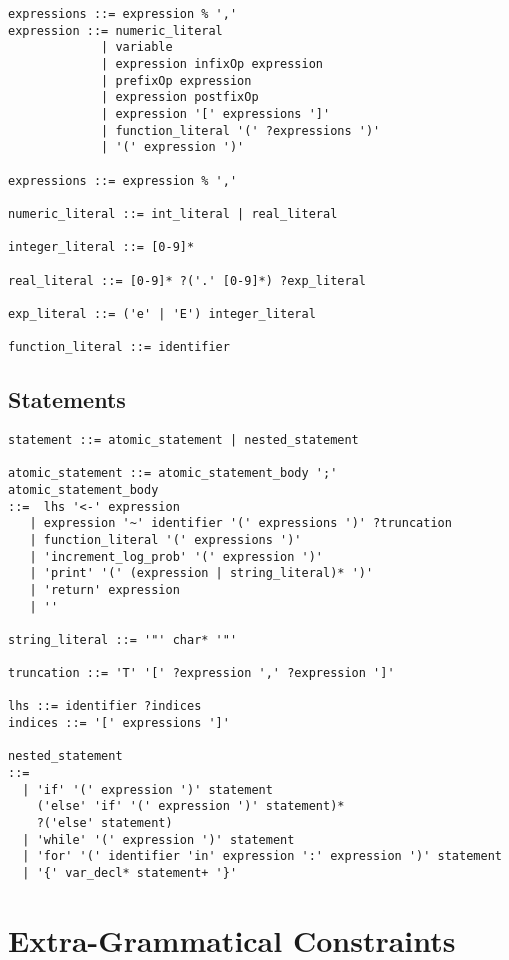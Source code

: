 {
\small
\begin{Verbatim}[fontsize=\small]
expressions ::= expression % ','
expression ::= numeric_literal
             | variable
             | expression infixOp expression
             | prefixOp expression
             | expression postfixOp
             | expression '[' expressions ']'
             | function_literal '(' ?expressions ')'
             | '(' expression ')'

expressions ::= expression % ','

numeric_literal ::= int_literal | real_literal

integer_literal ::= [0-9]*

real_literal ::= [0-9]* ?('.' [0-9]*) ?exp_literal
                  
exp_literal ::= ('e' | 'E') integer_literal

function_literal ::= identifier
\end{Verbatim}
}

\subsection{Statements}

{
\small
\begin{Verbatim}[fontsize=\small]
statement ::= atomic_statement | nested_statement

atomic_statement ::= atomic_statement_body ';'
atomic_statement_body
::=  lhs '<-' expression
   | expression '~' identifier '(' expressions ')' ?truncation
   | function_literal '(' expressions ')'
   | 'increment_log_prob' '(' expression ')'
   | 'print' '(' (expression | string_literal)* ')'
   | 'return' expression
   | ''

string_literal ::= '"' char* '"'

truncation ::= 'T' '[' ?expression ',' ?expression ']'

lhs ::= identifier ?indices
indices ::= '[' expressions ']'

nested_statement
::=
  | 'if' '(' expression ')' statement
    ('else' 'if' '(' expression ')' statement)*
    ?('else' statement)
  | 'while' '(' expression ')' statement
  | 'for' '(' identifier 'in' expression ':' expression ')' statement
  | '{' var_decl* statement+ '}'
\end{Verbatim}
%
}

\section{Extra-Grammatical Constraints}

